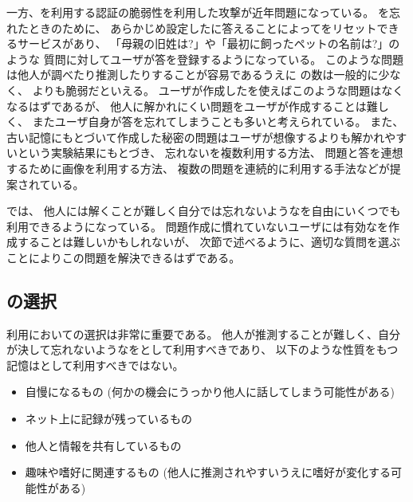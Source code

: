 \documentclass[twoside]{wiss}
\begin{document}
一方、{\SQ}を利用する認証の脆弱性を利用した攻撃が近年問題になっている。
{\PW}を忘れたときのために、
あらかじめ設定した{\SQ}に答えることによって{\PW}をリセットできるサービスがあり、
「母親の旧姓は?」や「最初に飼ったペットの名前は?」のような
質問に対してユーザが答を登録するようになっている。
このような問題は他人が調べたり推測したりすることが容易であるうえに
{\SQ}の数は一般的に少なく、
{\PW}よりも脆弱だといえる\cite{Rabkin:2008:PKQ:1408664.1408667}。%
%
ユーザが作成した{\SQ}を使えばこのような問題はなくなるはずであるが、
他人に解かれにくい問題をユーザが作成することは難しく、
またユーザ自身が答を忘れてしまうことも多いと考えられている\cite{Just:2009:PCC:1572532.1572543}\cite{Schechter:2009:NSM:1607723.1608145}。
%
また、古い記憶にもとづいて作成した秘密の問題はユーザが想像するよりも解かれやすいという実験結果にもとづき、
忘れない{\SQ}を複数利用する方法、
問題と答を連想するために画像を利用する方法、
複数の問題を連続的に利用する手法などが提案されている\cite{Renaud:2010:PQE:2146303.2146318}。

{\EP}では、
他人には解くことが難しく自分では忘れないような{\SQ}を自由にいくつでも利用できるようになっている。
問題作成に慣れていないユーザには有効な{\SQ}を作成することは難しいかもしれないが、
次節で述べるように、適切な質問を選ぶことによりこの問題を解決できるはずである。

\subsection{{\SQ}の選択}
\label{goodquestions}

{\EP}利用において{\SQ}の選択は非常に重要である。
他人が推測することが難しく、自分が決して忘れないような{\EM}を{\SQ}として利用すべきであり、
以下のような性質をもつ記憶は{\SQ}として利用すべきではない。

\begin{itemize}
\item \textsf{自慢になるもの
(何かの機会にうっかり他人に話してしまう可能性がある)}

\vspace{-1mm}
\item \textsf{ネット上に記録が残っているもの}

\vspace{-1mm}
\item \textsf{他人と情報を共有しているもの}

\vspace{-1mm}
\item \textsf{趣味や嗜好に関連するもの
(他人に推測されやすいうえに嗜好が変化する可能性がある)}

\end{itemize}
\end{document}
